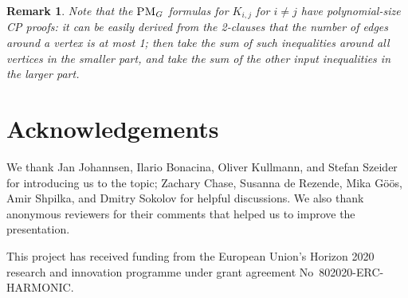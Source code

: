 \documentclass[11pt]{article}
\newcommand{\scterm}[1]{{\textrm{\sc #1}}}
\newcommand{\cp}{\scterm{CP}}
\newcommand{\PM}{\scterm{PM}}
\numberwithin{equation}{section}
\newtheorem{remark}[theorem]{Remark}
\begin{document}
\begin{remark}
Note that the $\PM_G$ formulas for $K_{i,j}$ for $i\neq j$
have polynomial-size {\cp} proofs: it can be easily derived from the 2-clauses
that the number of edges around a vertex is at most 1; then take the sum
of such inequalities around all vertices in the smaller part, and
take the sum of the other input inequalities in the larger part.
\end{remark}


\section*{Acknowledgements}
We thank Jan Johannsen, Ilario Bonacina, Oliver Kullmann, and Stefan Szeider for introducing us to the topic; Zachary Chase, Susanna de Rezende, Mika Göös, Amir Shpilka, and Dmitry Sokolov for helpful discussions. We also thank anonymous reviewers for their comments that helped us to improve the presentation.

This project has received funding from the European Union's Horizon 2020 research and innovation programme under grant agreement No~802020-ERC-HARMONIC.
\end{document}
